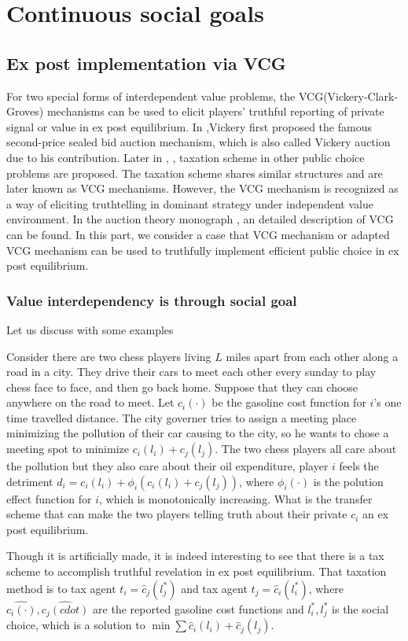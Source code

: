 \section{Continuous social goals}

\subsection{Ex post implementation via VCG}

For two special forms of interdependent value problems, the VCG(Vickery-Clark-Groves) mechanisms can be used to elicit players' truthful reporting of private signal or value in ex post equilibrium. In \parencite{Vickery61},Vickery first proposed the famous second-price sealed bid auction mechanism, which is also called Vickery auction due to his contribution. Later in \parencite{Clark71}, \parencite{Groves73}, taxation scheme in other public choice problems are proposed. The taxation scheme shares similar structures and are later known as VCG mechanisms. However, the VCG mechanism is recognized as a way of eliciting truthtelling in dominant strategy under independent value environment. In the auction theory monograph \parencite{Kris10}, an detailed description of VCG can be found.  In this part, we consider a case that VCG mechanism or adapted VCG mechanism can be used to truthfully implement efficient public choice in ex post equilibrium.

\subsubsection{Value interdependency is through social goal}

Let us discuss with some examples
\begin{example}
 Consider there are two chess players living $L$ miles apart from each other along a road in a city. They drive their cars to meet
 each other every sunday to play chess face to face, and then go back home. Suppose that they can choose anywhere on the road to meet. Let
 $c_i(\cdot)$ be the gasoline cost function for $i$'s one time travelled distance. 
The city governer tries to assign a meeting place minimizing the pollution of their car causing to the city, so he wants to
chose a meeting spot to minimize $c_i(l_i)+c_j(l_j)$. The two chess players all care about the 
pollution but they also care about their oil expenditure, player $i$ feels the detriment $d_i= c_i(l_i)+ \phi_i(c_i(l_i)+c_j(l_j))$, where $\phi_i(\cdot)$ is the polution effect function for $i$, which is monotonically increasing. What
 is the transfer scheme that can make the two players telling truth about their private $c_i$ an ex post equilibrium.
\end{example}
Though it is artificially made, it is indeed interesting to see that there is a tax scheme to accomplish truthful revelation in ex post equilibrium.
That taxation method is to tax agent $t_i= \hat{c}_j(l_j^*)$ and tax agent $t_j=\hat{c}_i(l_i^*)$, where $\hat{c_i(\cdot)},\hat{c_j(cdot)}$ are the reported gasoline cost functions and $l_i^*,l_j^*$ is the social choice, which is a solution to $\min\sum \hat{c}_i(l_i)+\hat{c}_j(l_j)$.


